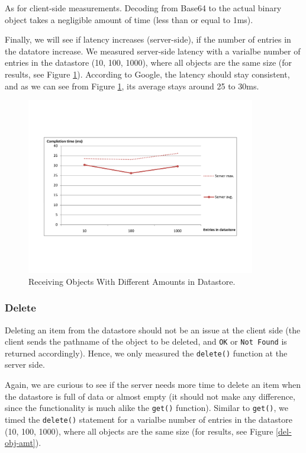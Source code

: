 As for client-side measurements. Decoding from Base64 to the actual binary
object takes a negligible amount of time (less than or equal to 1ms).

Finally, we will see if latency increases (server-side), if the number of
entries in the datatore increase. We measured server-side latency with a
varialbe number of entries in the datastore (10, 100, 1000), where all objects
are the same size (for results, see Figure \ref{get-obj-amt}). According to
Google, the latency should stay consistent, and as we can see from Figure
\ref{get-obj-amt}, its average stays around 25 to 30ms.

\begin{figure} %
\begin{center}
\includegraphics[trim=5cm 4cm 5cm 5cm,width=10cm]{./figures/get_amt.pdf}
\caption{Receiving Objects With Different Amounts in Datastore.
\label{get-obj-amt}}
\end{center}
\end{figure}

\subsubsection{Delete}
Deleting an item from the datastore should not be an issue at the client side
(the client sends the pathname of the object to be deleted, and \texttt{OK} or
\texttt{Not Found} is returned accordingly). Hence, we only measured the
\texttt{delete()} function at the server side. 

Again, we are curious to see if the server needs more time to delete an item
when the datastore is full of data or almost empty (it should not make any
difference, since the functionality is much alike the \texttt{get()} function).
Similar to \texttt{get()}, we timed the \texttt{delete()} statement for a
varialbe number of entries in the datastore (10, 100, 1000), where all objects
are the same size (for results, see Figure \ref{del-obj-amt}).

